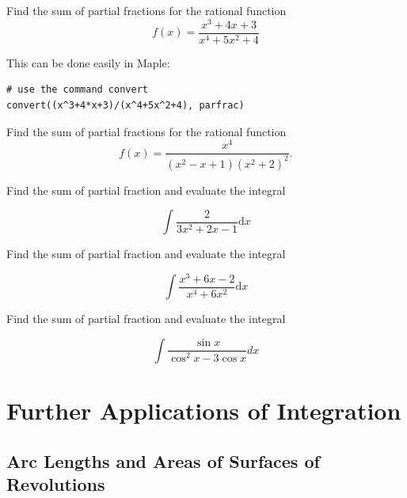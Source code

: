 \documentclass[en,11pt,simple]{elegantbook}
\let\BeginKnitrBlock\begin \let\EndKnitrBlock\end
\begin{document}
\BeginKnitrBlock{example}{}{}
\protect\hypertarget{exm:unnamed-chunk-208}{}{\label{exm:unnamed-chunk-208} }
Find the sum of partial fractions for the rational function
\[
f(x)=\frac{x^3+4x+3}{x^4+5x^2+4}
\]
\EndKnitrBlock{example}

\BeginKnitrBlock{solution}{}{}
{}
This can be done easily in Maple:

\begin{verbatim}
# use the command convert
convert((x^3+4*x+3)/(x^4+5x^2+4), parfrac)
\end{verbatim}
\EndKnitrBlock{solution}

\BeginKnitrBlock{exercise}{}{}
\protect\hypertarget{exr:unnamed-chunk-210}{}{\label{exr:unnamed-chunk-210} }
Find the sum of partial fractions for the rational function
\[
f(x)=\frac{x^{4}}{\left(x^{2}-x+1\right)\left(x^{2}+2\right)^{2}}.
\]
\EndKnitrBlock{exercise}

\BeginKnitrBlock{exercise}{}{}
\protect\hypertarget{exr:unnamed-chunk-211}{}{\label{exr:unnamed-chunk-211} }
Find the sum of partial fraction and evaluate the integral

\[
\int \frac{2}{3x^{2}+2x-1} \mathrm{d} x
\]
\EndKnitrBlock{exercise}

\BeginKnitrBlock{exercise}{}{}
\protect\hypertarget{exr:unnamed-chunk-212}{}{\label{exr:unnamed-chunk-212} }
Find the sum of partial fraction and evaluate the integral

\[
\int \frac{x^{3}+6 x-2}{x^{4}+6 x^{2}} \mathrm{d} x
\]
\EndKnitrBlock{exercise}

\BeginKnitrBlock{exercise}{}{}
\protect\hypertarget{exr:unnamed-chunk-213}{}{\label{exr:unnamed-chunk-213} }
Find the sum of partial fraction and evaluate the integral

\[
\int \frac{\sin x}{\cos ^{2} x-3 \cos x} d x
\]
\EndKnitrBlock{exercise}

\hypertarget{further-applications-of-integration}{%
\chapter{Further Applications of Integration}\label{further-applications-of-integration}}

\hypertarget{arc-lengths-and-areas-of-surfaces-of-revolutions}{%
\section{Arc Lengths and Areas of Surfaces of Revolutions}\label{arc-lengths-and-areas-of-surfaces-of-revolutions}}
\end{document}
